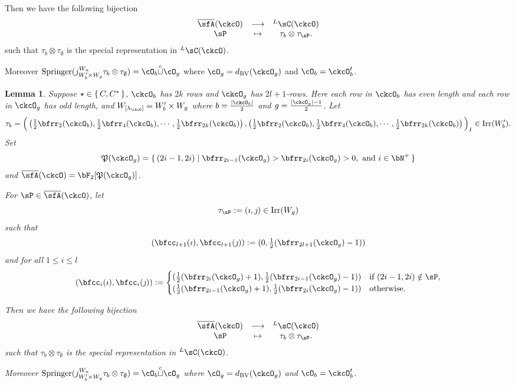 \documentclass[12pt,a4paper]{amsart}
\def\abs#1{\left|{#1}\right|}
\newcommand{\CQ}{{\mathcal {Q}}}
\numberwithin{equation}{section}
\newtheorem{lem}[thm]{Lemma}
\theoremstyle{remark}
\def\half{{\tfrac{1}{2}}}
\def\Irr{\mathrm{Irr}}
\def\dBV{d_{\mathrm{BV}}}
\def\WLamck{W_{[\lambda_{\ckcO}]}}
\def\LC{{}^L\sC}
\def\cupcol{{\stackrel{c}{\sqcup}}}
\def\Spr{\mathrm{Springer}}
\def\CQ{\overline{\sfA}}%
\def\CPP{\mathfrak{P}}
\begin{document}
  Then we have the following bijection
  \[
    \begin{array}{ccc}
      \CQ(\ckcO) &\longrightarrow & \LC(\ckcO)\\
      \sP & \mapsto & \tau_{b}\otimes \tau_{\sP}.
    \end{array}
  \]
  such that $\tau_{b}\otimes \tau_{\emptyset}$ is the special representation in
  $\LC(\ckcO)$.

  Moreover
  $\Spr(j_{W'_{b}\times W_{g}}^{W_{n}} \tau_{b}\otimes \tau_{\emptyset}) = \cO_{b}\cupcol \cO_{g}$
  where $\cO_{g} = \dBV(\ckcO_{g})$ and $\cO_{b} = \ckcO_{b}^{t}$.


\begin{lem}\label{lem:cell.C}
  Suppose $\star \in \set{C, C^{*}}$, $\ckcO_{b}$ has $2k$ rows and $\ckcO_{g}$
  has $2l+1$-rows. Here each row in $\ckcO_{b}$ has even length and each row in
  $\ckcO_{g}$ has odd length, and $\WLamck = W'_{b}\times W_{g}$ where
  $b= \frac{\abs{\ckcO_{b}}}{2}$ and $g = \frac{\abs{\ckcO_{g}}-1}{2}$. Let
  \[
    \tau_{b} = \Big( \left(\half\bfrr_{2}(\ckcO_{b}), \half\bfrr_{4}(\ckcO_{b}),\cdots, \half\bfrr_{2k}(\ckcO_{b})\right), \left(\half\bfrr_{2}(\ckcO_{b}), \half\bfrr_{4}(\ckcO_{b}),\cdots, \half\bfrr_{2k}(\ckcO_{b}) \right)\Big)_{I} \in \Irr(W'_{b}).
  \]
  Set
  \[
    \CPP(\ckcO_{g}) = \set{(2i-1,2i)| \bfrr_{2i-1}(\ckcO_{g})> \bfrr_{2i}(\ckcO_{g})>0, \text{
        and } i\in \bN^{+}}
  \]
  and $\CQ(\ckcO)= \bF_{2}[\CPP(\ckcO_{g})]$.

  For $\sP \in \CQ(\ckcO)$, let
  \[
    \tau_{\sP} := (\imath,\jmath) \in \Irr(W_{g})
  \]
  such that
  \[
    (\bfcc_{l+1}(\imath), \bfcc_{l+1}(\jmath)) := (0,\half(\bfrr_{2l+1}(\ckcO_{g})-1))
  \]
  and for all $1\leq i\leq l$
  \[
    (\bfcc_{i}(\imath), \bfcc_{i}(\jmath)):=
    \begin{cases}
      (\half (\bfrr_{2i}(\ckcO_{g})+1), \half (\bfrr_{2i-1}(\ckcO_{g})-1))
      & \text{if } (2i-1,2i)\notin \sP,\\
      (\half (\bfrr_{2i-1}(\ckcO_{g})+1),\half (\bfrr_{2i}(\ckcO_{g})-1)) & \text{otherwise.}
    \end{cases}
  \]

  Then we have the following bijection
  \[
    \begin{array}{ccc}
      \CQ(\ckcO) &\longrightarrow & \LC(\ckcO)\\
      \sP & \mapsto & \tau_{b}\otimes \tau_{\sP}.
    \end{array}
  \]
  such that $\tau_{b}\otimes \tau_{\emptyset}$ is the special representation in
  $\LC(\ckcO)$.

  Moreover
  $\Spr(j_{W'_{b}\times W_{g}}^{W_{n}} \tau_{b}\otimes \tau_{\emptyset}) = \cO_{b}\cupcol \cO_{g}$
  where $\cO_{g} = \dBV(\ckcO_{g})$ and $\cO_{b} = \ckcO_{b}^{t}$.
\end{lem}
\end{document}
